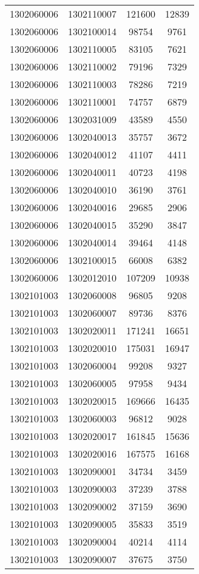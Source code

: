 \begin{longtable}[h]{llcc}
		1302060006 & 1302110007 & 121600 & 12839\\
		1302060006 & 1302100014 & 98754 & 9761\\
		1302060006 & 1302110005 & 83105 & 7621\\
		1302060006 & 1302110002 & 79196 & 7329\\
		1302060006 & 1302110003 & 78286 & 7219\\
		1302060006 & 1302110001 & 74757 & 6879\\
		1302060006 & 1302031009 & 43589 & 4550\\
		1302060006 & 1302040013 & 35757 & 3672\\
		1302060006 & 1302040012 & 41107 & 4411\\
		1302060006 & 1302040011 & 40723 & 4198\\
		1302060006 & 1302040010 & 36190 & 3761\\
		1302060006 & 1302040016 & 29685 & 2906\\
		1302060006 & 1302040015 & 35290 & 3847\\
		1302060006 & 1302040014 & 39464 & 4148\\
		1302060006 & 1302100015 & 66008 & 6382\\
		1302060006 & 1302012010 & 107209 & 10938\\
		1302101003 & 1302060008 & 96805 & 9208\\
		1302101003 & 1302060007 & 89736 & 8376\\
		1302101003 & 1302020011 & 171241 & 16651\\
		1302101003 & 1302020010 & 175031 & 16947\\
		1302101003 & 1302060004 & 99208 & 9327\\
		1302101003 & 1302060005 & 97958 & 9434\\
		1302101003 & 1302020015 & 169666 & 16435\\
		1302101003 & 1302060003 & 96812 & 9028\\
		1302101003 & 1302020017 & 161845 & 15636\\
		1302101003 & 1302020016 & 167575 & 16168\\
		1302101003 & 1302090001 & 34734 & 3459\\
		1302101003 & 1302090003 & 37239 & 3788\\
		1302101003 & 1302090002 & 37159 & 3690\\
		1302101003 & 1302090005 & 35833 & 3519\\
		1302101003 & 1302090004 & 40214 & 4114\\
		1302101003 & 1302090007 & 37675 & 3750\\

\end{longtable}
